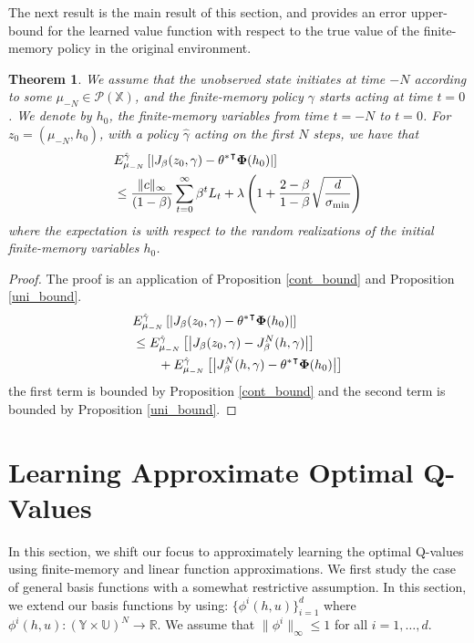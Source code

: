 \documentclass[letterpaper, 10 pt, conference]{ieeeconf}  %
\def\P{{\mathcal P}}
\newtheorem{theorem}{Theorem}
\theoremstyle{definition}
\theoremstyle{remark}
\begin{document}
The next result is the main result of this section, and provides an error upper-bound for the learned value function with respect to the true value of the finite-memory policy in the original environment.
\begin{theorem}
We assume that the unobserved state initiates at time $-N$ according to some $\mu_{-N}\in \P(\mathds{X})$, and the finite-memory policy $\gamma$ starts acting at time $t=0$. We denote by $h_0$, the finite-memory variables from time $t=-N$ to $t=0$. For ${z}_0=(\mu_{-N},h_0)$, with a policy $\hat{\gamma}$ acting on the first $N$ steps, we have that
\begin{align*}
&E_{\mu_{-N}}^{\hat{\gamma}}\left[\left|J_\beta({z}_0,{\gamma}) -{\theta^*}^\intercal {\bf \Phi}(h_0)\right|\right]\\
&\leq  \frac{\|c\|_\infty }{(1-\beta)}\sum_{t=0}^\infty\beta^tL_t + \lambda\left(1+ \frac{2-\beta}{1-\beta}  \sqrt{\frac{d}{\sigma_{\min}}  }\right)
\end{align*}
 where the expectation is with respect to the random realizations of the initial finite-memory variables $h_0$. 
\end{theorem}
\begin{proof}
The proof is an application of Proposition \ref{cont_bound} and Proposition \ref{uni_bound}.
\begin{align*}
&E_{\mu_{-N}}^{\hat{\gamma}}\left[\left|J_\beta({z}_0,{\gamma}) -{\theta^*}^\intercal {\bf \Phi}(h_0)\right|\right]\\
&\leq  E_{\mu_{-N}}^{\hat{\gamma}}\left[\left|J_\beta({z}_0,{\gamma}) -  J_\beta^N(h,\gamma) \right|\right] \\
&\qquad+ E_{\mu_{-N}}^{\hat{\gamma}}\left[\left| J_\beta^N(h,\gamma) - {\theta^*}^\intercal {\bf \Phi}(h_0)  \right|\right]
\end{align*}
the first term is bounded by Proposition \ref{cont_bound} and the second term is bounded by Proposition \ref{uni_bound}.
\end{proof}

\section{Learning Approximate Optimal Q-Values }
In this section, we shift our focus to approximately learning the optimal Q-values using finite-memory and linear function approximations. 
We first study the case of general basis functions with a somewhat restrictive assumption. In this section, we extend our basis functions by using: $\{\phi^i(h,u)\}_{i=1}^d$ where  $\phi^i(h,u):\left(\mathds{Y}\times\mathds{U}\right)^N\to \mathds{R}$.
We assume that $
\|\phi^i\|_\infty\leq 1$
for all $i=1,\dots,d$.
\end{document}
